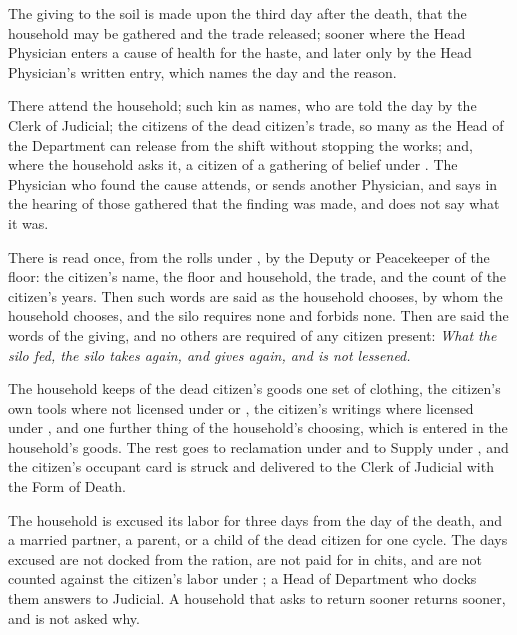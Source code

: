\begin{clauses}
\item The giving to the soil is made upon the third day after the death, that the household may be gathered and the trade released; sooner where the Head Physician enters a cause of health for the haste, and later only by the Head Physician's written entry, which names the day and the reason.
\item There attend the household; such kin as  names, who are told the day by the Clerk of Judicial; the citizens of the dead citizen's trade, so many as the Head of the Department can release from the shift without stopping the works; and, where the household asks it, a citizen of a gathering of belief under . The Physician who found the cause attends, or sends another Physician, and says in the hearing of those gathered that the finding was made, and does not say what it was.
\item There is read once, from the rolls under , by the Deputy or Peacekeeper of the floor: the citizen's name, the floor and household, the trade, and the count of the citizen's years. Then such words are said as the household chooses, by whom the household chooses, and the silo requires none and forbids none. Then are said the words of the giving, and no others are required of any citizen present: \emph{What the silo fed, the silo takes again, and gives again, and is not lessened.}
\item The household keeps of the dead citizen's goods one set of clothing, the citizen's own tools where not licensed under  or , the citizen's writings where licensed under , and one further thing of the household's choosing, which is entered in the household's goods. The rest goes to reclamation under  and to Supply under , and the citizen's occupant card is struck and delivered to the Clerk of Judicial with the Form of Death.
\item The household is excused its labor for three days from the day of the death, and a married partner, a parent, or a child of the dead citizen for one cycle. The days excused are not docked from the ration, are not paid for in chits, and are not counted against the citizen's labor under ; a Head of Department who docks them answers to Judicial. A household that asks to return sooner returns sooner, and is not asked why.

\end{clauses}
